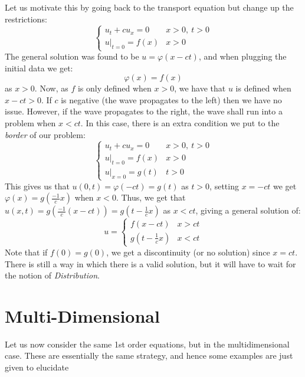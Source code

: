 \documentclass{book}
\renewcommand{\phi}{\varphi}
\begin{document}
Let us motivate this by going back to the transport equation but change up the restrictions:
\[
	\begin{cases}
		u_t + cu_x = 0 & x > 0,\ t > 0\\
		u|_{t=0} = f(x) & x > 0
	\end{cases}
\]
The general solution was found to be $u = \phi(x-ct)$, and when plugging the initial data we get:
\[
	\phi(x) = f(x)
\]
as $ x > 0$. Now, as $f$ is only defined when $x > 0$, we have that $u$ is defined when $x - ct  >0$. If $c$
is negative (the wave propagates to the left) then we have no issue. However, if the wave propagates to the
right, the wave shall run into a problem when $x < ct$. In this case, there is an extra condition we put to
the \emph{border} of our problem:
\[
	\begin{cases}
		u_t + cu_x = 0 & x > 0,\ t > 0\\
		u|_{t=0} = f(x) & x > 0\\
		u|_{x=0} = g(t) & t > 0
	\end{cases}
\]
This gives us that $u(0,t) = \phi(-ct) = g(t)$ as $t > 0$, setting $x = -ct$ we get $\phi(x) = g(\frac{-1}{c}
x)$ when $x < 0$. Thus, we get that $u(x,t) = g( \frac{-1}{c}(x-ct)) = g(t - \frac{1}{c}x)$ as $x < ct$,
giving a general solution of:
\[
	u = \begin{cases}
		f(x-ct) & x > ct\\
		g(t - \frac{1}{c}x) & x < ct
	\end{cases}
\]
Note that if $f(0) = g(0)$, we get a discontinuity (or no solution) since $x = ct$. There is still a way in
which there is a valid solution, but it will have to wait for the notion of \emph{Distribution}.


\section{Multi-Dimensional}

Let us now consider the same 1st order equations, but in the multidimensional case. These are essentially the
same strategy, and hence some examples are just given to elucidate
\end{document}

